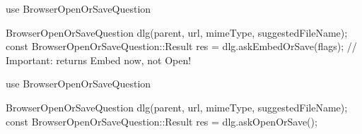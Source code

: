 
\begin{DoxyRefList}
\item[\label{deprecated__deprecated000005}%
\hypertarget{deprecated__deprecated000005}{}%
Member \hyperlink{classKParts_1_1BrowserRun_a548576ed0ee79c29f1b68d16922ae6bd}{K\+Parts\+:\+:Browser\+Run\+:\+:ask\+Embed\+Or\+Save} (const K\+Url \&url, const Q\+String \&mime\+Type, const Q\+String \&suggested\+File\+Name=Q\+String(), int flags=0)]use Browser\+Open\+Or\+Save\+Question 
\begin{DoxyCode}
BrowserOpenOrSaveQuestion dlg(parent, url, mimeType, suggestedFileName);
\textcolor{keyword}{const} BrowserOpenOrSaveQuestion::Result res = dlg.askEmbedOrSave(flags);
\textcolor{comment}{// Important: returns Embed now, not Open!}
\end{DoxyCode}
  
\item[\label{deprecated__deprecated000004}%
\hypertarget{deprecated__deprecated000004}{}%
Member \hyperlink{classKParts_1_1BrowserRun_a240c17aac1cd740315731916f0616723}{K\+Parts\+:\+:Browser\+Run\+:\+:ask\+Save} (const K\+Url \&url, K\+Service\+::\+Ptr offer, const Q\+String \&mime\+Type, const Q\+String \&suggested\+File\+Name=Q\+String())]use Browser\+Open\+Or\+Save\+Question 
\begin{DoxyCode}
BrowserOpenOrSaveQuestion dlg(parent, url, mimeType, suggestedFileName);
\textcolor{keyword}{const} BrowserOpenOrSaveQuestion::Result res = dlg.askOpenOrSave();
\end{DoxyCode}
  

\end{DoxyRefList}
